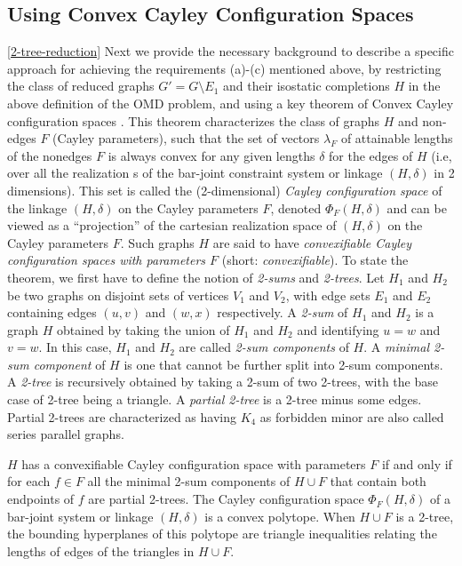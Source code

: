 \subsection{Using Convex Cayley Configuration Spaces}
%
\ref{2-tree-reduction}
Next we provide the necessary background to describe a specific approach for achieving the requirements
(a)-(c) mentioned above, by restricting the class of reduced graphs $G' =
G\setminus E_1$ and their isostatic completions $H$ in the above definition of the
OMD problem, and using a key theorem of Convex Cayley configuration
spaces \cite{XX}. This theorem characterizes the class of graphs $H$ and non-edges $F$ (Cayley
parameters), such that the set of vectors $\lambda_F$ of  attainable lengths of
the nonedges $F$
is always convex for any
given lengths $\delta$ for the edges of $H$ (i.e, over all the realization
s of the bar-joint constraint system or linkage $(H,\delta)$ in 2 dimensions).
This set is called the (2-dimensional) {\em Cayley configuration space}
of the linkage $(H,\delta)$ on the Cayley parameters $F$, denoted
$\Phi_F(H,\delta)$ and can be viewed as a ``projection'' of the cartesian
realization space of $(H,\delta)$ on the Cayley parameters $F$.
Such graphs $H$ are said to have {\em convexifiable Cayley configuration spaces
with parameters $F$} (short: {\em convexifiable}). To state the theorem, we first have to define the
notion of {\em 2-sums} and {\em 2-trees}.
Let $H_1$ and $H_2$ be two graphs on disjoint sets of vertices $V_1$ and
$V_2$, with edge sets $E_1$ and $E_2$ containing edges $(u,v)$ and $(w,x)$
respectively.  A {\em 2-sum} of
$H_1$ and $H_2$ is a
graph $H$  obtained by taking the union of $H_1$ and $H_2$ and identifying $u=w$ and $v=w$.
In this case, $H_1$ and $H_2$ are called {\em 2-sum components} of $H$.
A {\em minimal 2-sum component} of $H$ is  one that cannot be further split
into 2-sum components.
A {\em 2-tree} is recursively obtained by taking
a 2-sum of two 2-trees, with the base case of 2-tree being a triangle.
A {\em partial 2-tree} is a 2-tree minus some edges.
Partial 2-trees are characterized as having $K_4$ as forbidden minor are also called series parallel graphs.

\begin{theorem}
    \label{convexcayley}
    \cite{XX}
    $H$ has a convexifiable Cayley configuration space  with parameters $F$
    if and only if for each $f\in F$  all the minimal 2-sum components
    of $H\cup F$ that contain both endpoints of $f$ are partial 2-trees.
    The Cayley configuration space $\Phi_F(H,\delta)$
    of a bar-joint system or linkage $(H,\delta)$ is a convex polytope.
    When $H\cup F$ is a 2-tree, the
    bounding hyperplanes of this polytope are triangle inequalities
    relating the lengths of edges of the triangles in $H\cup F$.
\end{theorem}

